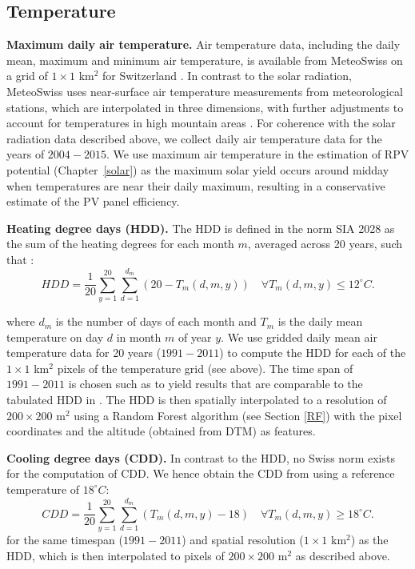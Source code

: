 \subsection{Temperature}

\textbf{Maximum daily air temperature.} Air temperature data, including the daily mean, maximum and minimum air temperature, is available from MeteoSwiss on a grid of $1 \times 1$ km$^2$ for Switzerland \cite{meteoswiss_daily_2017}. 
In contrast to the solar radiation, MeteoSwiss uses near-surface air temperature measurements from meteorological stations, which are interpolated in three dimensions, with further adjustments to account for temperatures in high mountain areas \cite{meteoswiss_daily_2017}.
For coherence with the solar radiation data described above, we collect daily air temperature data for the years of $2004-2015$. 
We use maximum air temperature in the estimation of RPV potential (Chapter~\ref{solar}) as the maximum solar yield occurs around midday when temperatures are near their daily maximum, resulting in a conservative estimate of the PV panel efficiency.

\textbf{Heating degree days (HDD).}
\label{app:HDD}
The HDD is defined in the norm SIA 2028 as the sum of the heating degrees for each month $m$, averaged across 20 years, such that \cite{sia_klimadaten_2010}: 
\begin{equation}
\label{eq:hdd}
    HDD = \frac{1}{20} \sum_{y=1}^{20} \sum_{d=1}^{d_m} (20 - T_{m}(d, m, y)) \quad \forall T_{m} (d, m, y) \leq 12 ^\circ C. 
\end{equation}

where $d_m$ is the number of days of each month and $T_{m}$ is the daily mean temperature on day $d$ in month $m$ of year $y$. 
We use gridded daily mean air temperature data for 20 years ($1991-2011$) \cite{meteoswiss_daily_2017} to compute the HDD for each of the $1 \times 1$  km$^2$ pixels of the temperature grid (see above). The time span of  $1991-2011$ is chosen such as to yield results that are comparable to the tabulated HDD in \cite{sia_klimadaten_2010}.
The HDD is then spatially interpolated to a resolution of $200 \times 200$ m$^2$ using a Random Forest algorithm (see Section \ref{RF}) with the pixel coordinates and the altitude (obtained from DTM) as features.

\textbf{Cooling degree days (CDD).} In contrast to the HDD, no Swiss norm exists for the computation of CDD. We hence obtain the CDD from \cite{christenson_climate_2006} using a reference temperature of $18 ^\circ C$:
\begin{equation}
\label{eq:cdd}
    CDD = \frac{1}{20} \sum_{y=1}^{20} \sum_{d=1}^{d_m} (T_{m}(d, m, y)-18) \quad \forall T_{m} (d, m, y) \geq 18 ^\circ C. 
\end{equation}
for the same timespan ($1991-2011$) and spatial resolution ($1 \times 1$ km$^2$) as the HDD, which is then interpolated to pixels of $200 \times 200$ m$^2$ as described above.


